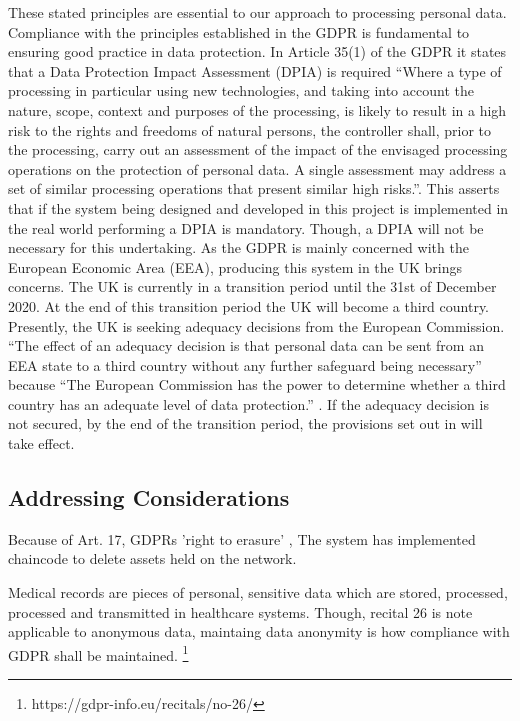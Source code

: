  These stated principles are essential to our approach to
 processing personal data. Compliance with the principles
 established in the GDPR is fundamental to ensuring good
 practice in data protection.
 In Article 35(1) of the GDPR it states that a Data Protection
 Impact Assessment (DPIA) is required “Where a type of
 processing in particular using new technologies, and taking
 into account the nature, scope, context and purposes of the
 processing, is likely to result in a high risk to the rights and
 freedoms of natural persons, the controller shall, prior to the
 processing, carry out an assessment of the impact of the
 envisaged processing operations on the protection of personal
 data. A single assessment may address a set of similar
 processing operations that present similar high risks.”. This
 asserts that if the system being designed and developed in this
 project is implemented in the real world performing a DPIA is
 mandatory. Though, a DPIA will not be necessary for this
 undertaking.
 As the GDPR is mainly concerned with the European
 Economic Area (EEA), producing this system in the UK
 brings concerns. The UK is currently in a transition period
 until the 31st of December 2020. At the end of this transition
 period the UK will become a third country. Presently, the UK
 is seeking adequacy decisions from the European
 Commission. “The effect of an adequacy decision is that
 personal data can be sent from an EEA state to a third country
 without any further safeguard being necessary” because “The
 European Commission has the power to determine whether a
 third country has an adequate level of data protection.” \cite{noauthor_information_2020}. If
 the adequacy decision is not secured, by the end of the
 transition period, the provisions set out in \cite{noauthor_agreement_2019} will take effect.
 
 \subsection{Addressing Considerations}
 Because of Art. 17, GDPRs 'right to erasure' \cite{noauthor_art_nodate}, 
 The system has implemented chaincode to delete assets held on the network.

 Medical records are pieces of personal, sensitive data which are stored, processed, processed and transmitted in healthcare systems.
Though, recital 26 is note applicable to anonymous data, maintaing data anonymity is how compliance with GDPR shall be maintained. \footnote{https://gdpr-info.eu/recitals/no-26/}



